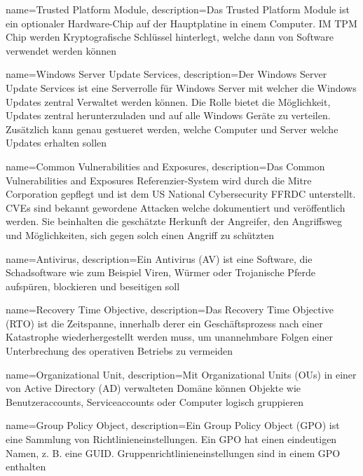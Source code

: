 {
    name=Trusted Platform Module,
    description={Das Trusted Platform Module ist ein optionaler Hardware-Chip auf der Hauptplatine in einem Computer. IM TPM Chip werden Kryptografische Schlüssel hinterlegt, welche dann von Software verwendet werden können}
}

{
    name=Windows Server Update Services,
    description={Der Windows Server Update Services ist eine Serverrolle für Windows Server mit welcher die Windows Updates zentral Verwaltet werden können. Die Rolle bietet die Möglichkeit, Updates zentral herunterzuladen und auf alle Windows Geräte zu verteilen. Zusätzlich kann genau gestueret werden, welche Computer und Server welche Updates erhalten sollen}
}

{
    name=Common Vulnerabilities and Exposures,
    description={Das Common Vulnerabilities and Exposures Referenzier-System wird durch die Mitre Corporation gepflegt und ist dem US National Cybersecurity FFRDC unterstellt. CVEs sind bekannt gewordene Attacken welche dokumentiert und veröffentlich werden. Sie beinhalten die geschätzte Herkunft der Angreifer, den Angriffsweg und Möglichkeiten, sich gegen solch einen Angriff zu schützten}
}

{
    name=Antivirus,
    description={Ein Antivirus (AV) ist eine Software, die Schadsoftware wie zum Beispiel Viren, Würmer oder Trojanische Pferde aufspüren, blockieren und beseitigen soll}
}

{
    name=Recovery Time Objective,
    description={Das Recovery Time Objective (RTO) ist die Zeitspanne, innerhalb derer ein Geschäftsprozess nach einer Katastrophe wiederhergestellt werden muss, um unannehmbare Folgen einer Unterbrechung des operativen Betriebs zu vermeiden}
}

{
    name=Organizational Unit,
    description={Mit Organizational Units (OUs) in einer von Active Directory (AD) verwalteten Domäne können Objekte wie Benutzeraccounts, Serviceaccounts oder Computer logisch gruppieren}
}

{
    name=Group Policy Object,
    description={Ein Group Policy Object (GPO) ist eine Sammlung von Richtlinieneinstellungen. Ein GPO hat einen eindeutigen Namen, z. B. eine GUID. Gruppenrichtlinieneinstellungen sind in einem GPO enthalten}
}

